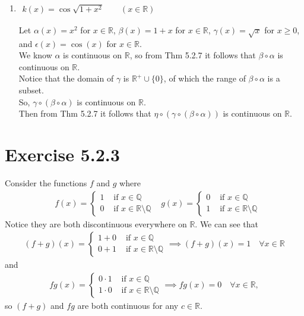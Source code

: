 \documentclass[11pt]{article}
\newcommand{\bbR}{\mathbb{R}}  %
\newcommand{\Q}{\mathbb{Q}}  %
\begin{document}
\begin{enumerate}[label=(\alph*)]
    \item $\begin{aligned} k(x)=\cos\sqrt{1+x^2} \qquad (x\in\bbR)\end{aligned}$

    Let $\alpha(x)=x^2$ for $x\in\bbR$, $\beta(x)=1+x$ for $x\in\bbR$, $\gamma(x)=\sqrt{x}$ for $x\geq 0$, and $\epsilon(x)=\cos(x)$ for $x\in\bbR$. \\
    We know $\alpha$ is continuous on $\bbR$, so from Thm 5.2.7 it follows that $\beta\circ\alpha$ is continuous on $\bbR$. \\
    Notice that the domain of $\gamma$ is $\bbR^+\cup\{0\}$, of which the range of $\beta\circ\alpha$ is a subset. \\
    So, $\gamma\circ(\beta\circ\alpha)$ is continuous on $\bbR$. \\
    Then from Thm 5.2.7 it follows that $\eta\circ(\gamma\circ(\beta\circ\alpha))$ is continuous on $\bbR$.
\end{enumerate}

\section*{Exercise 5.2.3}\vspace{-1em}
    Consider the functions $f$ and $g$ where
    \begin{align}
        &f(x)=\begin{cases}
            1 & \text{ if } x\in\Q \\
            0 & \text{ if } x\in\bbR\setminus\Q
        \end{cases}
        &g(x)=\begin{cases}
            0 & \text{ if } x\in\Q \\
            1 & \text{ if } x\in\bbR\setminus\Q
        \end{cases}
    \end{align}
    Notice they are both discontinuous everywhere on $\bbR$. We can see that
    \begin{align}
        (f+g)(x)=\begin{cases}
            1+0 & \text{ if } x\in\Q \\
            0+1 & \text{ if } x\in\bbR\setminus\Q
        \end{cases} \implies (f+g)(x)=1 \quad \forall x\in\bbR
    \end{align}
    and
    \begin{align}
        fg(x)=\begin{cases}
            0\cdot 1 & \text{ if } x\in\Q \\
            1\cdot 0 & \text{ if } x\in\bbR\setminus\Q
        \end{cases} \implies fg(x)=0 \quad \forall x\in\bbR,
    \end{align}
    so $(f+g)$ and $fg$ are both continuous for any $c\in\bbR$.
    \vspace{-1em}
\end{document}
